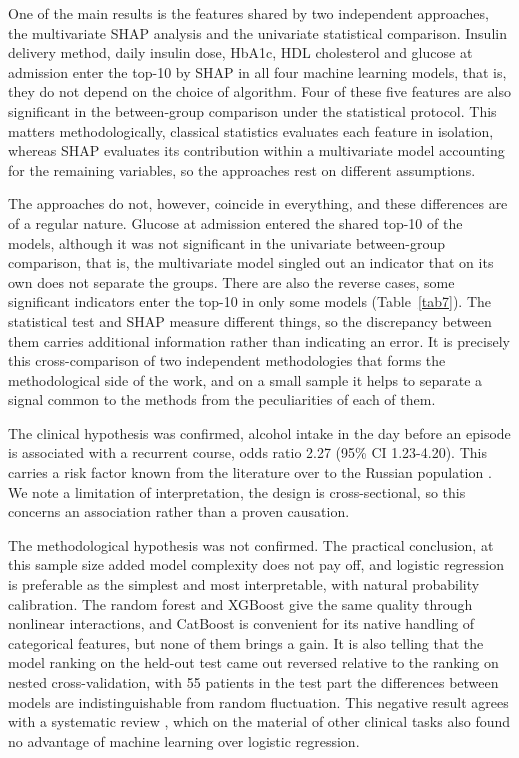\documentclass[pdflatex,sn-basic,Numbered]{sn-jnl}
\begin{document}
One of the main results is the features shared by two independent approaches, the multivariate SHAP analysis and the univariate statistical comparison. Insulin delivery method, daily insulin dose, HbA1c, HDL cholesterol and glucose at admission enter the top-10 by SHAP in all four machine learning models, that is, they do not depend on the choice of algorithm. Four of these five features are also significant in the between-group comparison under the statistical protocol. This matters methodologically, classical statistics evaluates each feature in isolation, whereas SHAP evaluates its contribution within a multivariate model accounting for the remaining variables, so the approaches rest on different assumptions.

The approaches do not, however, coincide in everything, and these differences are of a regular nature. Glucose at admission entered the shared top-10 of the models, although it was not significant in the univariate between-group comparison, that is, the multivariate model singled out an indicator that on its own does not separate the groups. There are also the reverse cases, some significant indicators enter the top-10 in only some models (Table~\ref{tab7}). The statistical test and SHAP measure different things, so the discrepancy between them carries additional information rather than indicating an error. It is precisely this cross-comparison of two independent methodologies that forms the methodological side of the work, and on a small sample it helps to separate a signal common to the methods from the peculiarities of each of them.

The clinical hypothesis was confirmed, alcohol intake in the day before an episode is associated with a recurrent course, odds ratio 2.27 (95\% CI 1.23-4.20). This carries a risk factor known from the literature over to the Russian population \cite{ref7,ref9,ref16}. We note a limitation of interpretation, the design is cross-sectional, so this concerns an association rather than a proven causation.

The methodological hypothesis was not confirmed. The practical conclusion, at this sample size added model complexity does not pay off, and logistic regression is preferable as the simplest and most interpretable, with natural probability calibration. The random forest and XGBoost give the same quality through nonlinear interactions, and CatBoost is convenient for its native handling of categorical features, but none of them brings a gain. It is also telling that the model ranking on the held-out test came out reversed relative to the ranking on nested cross-validation, with 55 patients in the test part the differences between models are indistinguishable from random fluctuation. This negative result agrees with a systematic review \cite{ref17}, which on the material of other clinical tasks also found no advantage of machine learning over logistic regression.
\end{document}
